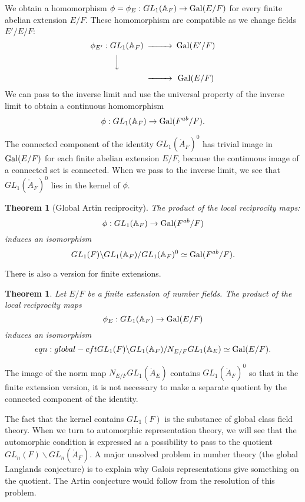 \documentclass{amsart}
\newtheorem{theorem}[equation]{Theorem}
\def\AA{\ring{A}}
\def\oG{\op{Gal}}
\begin{document}
We obtain a homomorphism $\phi = \phi_E:GL_1(\AA_F)\to \oG(E/F)$ for every finite
abelian extension $E/F$.  These homomorphism are compatible as we change fields $E'/E/F$:
\[
\begin{CD}
\phi_{E'}: GL_1(\AA_F) @>>> \oG(E'/F)\\
@VVV \\
@>>> \oG(E/F)\\
\end{CD}
\]
We can pass to the inverse limit and use the universal property of the inverse limit to
obtain a continuous homomorphism
\[
\phi: GL_1(\AA_F) \to \oG(F^{ab}/F).
\]

The connected component of the identity $GL_1(\AA_F)^0$ has trivial image in
$\oG(E/F)$ for each finite abelian extension $E/F$, because the continuous image
of a connected set is connected.  When we pass to the inverse limit, we see that
$GL_1(\AA_F)^0$ lies in the kernel of $\phi$.

\begin{theorem}[Global Artin reciprocity]  The product of the local reciprocity maps:
\[
\phi:GL_1(\AA_F)\to \oG(F^{ab}/F)
\]
induces an isomorphism
\[
GL_1(F)\backslash GL_1(\AA_F)/ GL_1(\AA_F)^0 \simeq \oG(F^{ab}/F).
\]
\end{theorem}

There is also a  version for finite extensions.

\begin{theorem} Let $E/F$ be a finite extension of number fields.  The product of
the local reciprocity maps
\[
\phi_E:GL_1(\AA_F)\to \oG(E/F)
\]
induces an isomorphism
\begin{equation}{eqn:global-cft}
GL_1(F)\backslash GL_1(\AA_F)/ N_{E/F} GL_1(\AA_E) \simeq \oG(E/F).
\end{equation}
\end{theorem}

The image of the norm map $N_{E/F} GL_1(\AA_E)$ contains $GL_1(\AA_F)^0$ so 
that in the finite extension version, it is not necessary to make a separate quotient
by the connected component of the identity.

The fact that the kernel contains $GL_1(F)$ is the substance of global class field theory.
When we turn to automorphic representation theory, we will see that the automorphic
condition is expressed as a possibility to pass to the quotient $GL_n(F)\backslash GL_n(\AA_F)$.
A major unsolved problem in number theory (the global Langlands conjecture) is to
explain why Galois representations give something on the quotient.
The Artin conjecture would follow from the resolution of this problem.
\end{document}
